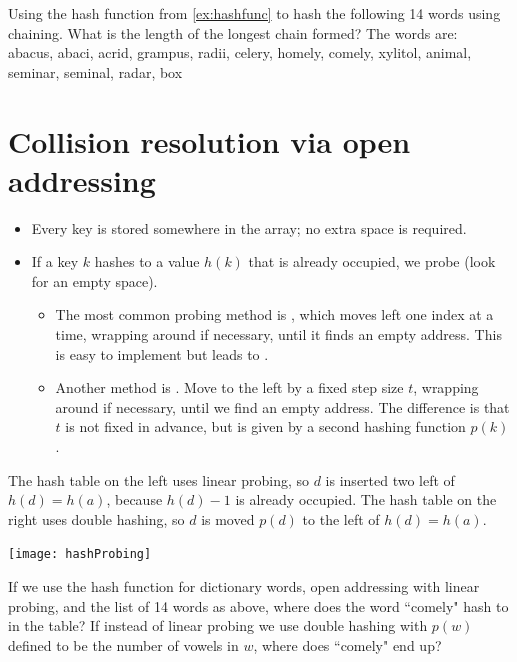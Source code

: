 \begin{Boxample}[6]
Using the hash function from \cref{ex:hashfunc} to hash the following 14 words using chaining. What is the length of the longest chain formed?
The words are:\\
abacus, abaci, acrid, grampus, radii, celery, homely, comely, xylitol, animal, seminar, seminal, radar, box

\end{Boxample}

\section{Collision resolution via open addressing}
\begin{itemize}
	\item Every key is stored somewhere in the array; no extra space is required.
	\item If a key  $k$ hashes to a value $h(k)$ that is already occupied, 
	we probe (look for an empty space). 
	\begin{itemize}
		\item The most common probing method is , which moves left
		 one index at a time, wrapping around if necessary, until it finds an empty 
		 address. This is easy to implement but leads to .
		\item Another method is . Move to the left by a
		fixed step size $t$, wrapping around if necessary, until we find an
		empty address. The difference is that $t$ is not fixed in advance, but
		is given by a second hashing function $p(k)$.
	\end{itemize}
\end{itemize}

\begin{Boxample}
The hash table on the left uses linear probing, so $d$ is inserted two left of $h(d) = h(a)$, because $h(d)-1$ is already occupied.
The hash table on the right uses double hashing, so $d$ is moved $p(d)$ to the left of $h(d) = h(a)$. 
\begin{center}
\texttt{[image: hashProbing]} 
\end{center}
\label{ex:probing}
\end{Boxample}

\begin{Boxample}[4]
If we use the hash function for dictionary words, open addressing with linear probing, and the list of 14 words as above,
where does the word ``comely" hash to in the table?
If instead of linear probing we use double hashing with $p(w)$ defined to be the number of vowels in $w$, where does ``comely" end up?
\end{Boxample}


